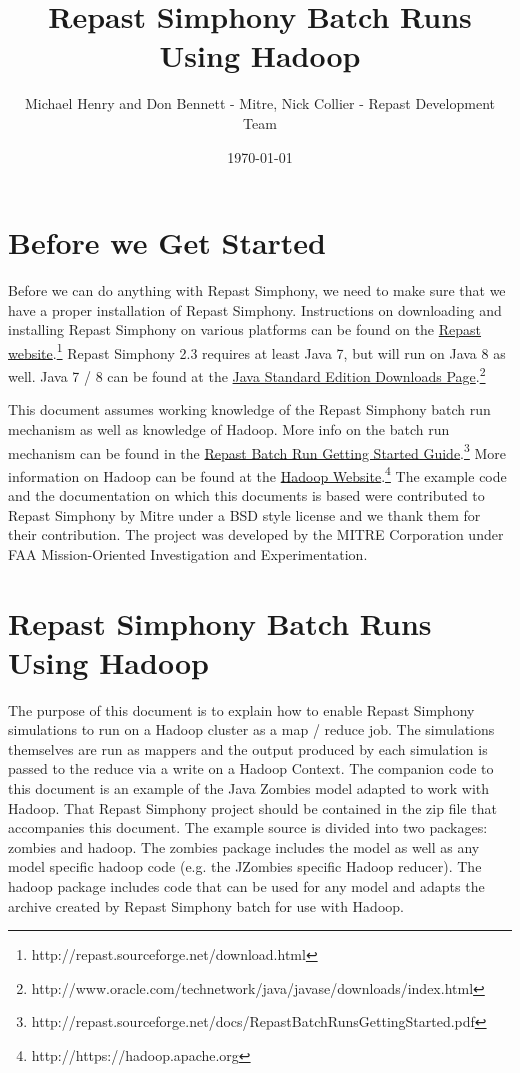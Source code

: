 \documentclass[11pt]{amsart}
\title{Repast Simphony Batch Runs Using Hadoop}
\author{Michael Henry and Don Bennett - Mitre, Nick Collier - Repast Development Team}
\date{\today}                                           %
\begin{document}
 
\maketitle
\setcounter{section}{-1}

\section{Before we Get Started}
Before we can do anything with Repast Simphony, we need to make sure that we have a proper installation of Repast Simphony. Instructions on downloading and installing Repast Simphony on various platforms can be found on the \href{http://repast.sourceforge.net/download.html}{Repast website}.\footnote{http://repast.sourceforge.net/download.html} Repast Simphony 2.3 requires at least Java 7, but will run on Java 8 as well. Java 7 / 8  can be found at the \href{http://www.oracle.com/technetwork/java/javase/downloads/index.html}{Java Standard Edition Downloads Page}.\footnote{http://www.oracle.com/technetwork/java/javase/downloads/index.html} 

This document assumes working knowledge of the Repast Simphony batch run mechanism as well as knowledge of Hadoop. More info on the batch run mechanism can be found in the \href{http://repast.sourceforge.net/docs/RepastBatchRunsGettingStarted.pdf}{Repast Batch Run Getting Started Guide}.\footnote{http://repast.sourceforge.net/docs/RepastBatchRunsGettingStarted.pdf} More information on Hadoop can be found at the \href{https://hadoop.apache.org}{Hadoop Website}.\footnote{http://https://hadoop.apache.org} The example code and the documentation on which this documents is based were contributed to Repast Simphony by Mitre under a BSD style license and we thank them for their contribution. The project was developed by the MITRE Corporation under FAA Mission-Oriented Investigation and Experimentation.

\section{Repast Simphony Batch Runs Using Hadoop}
The purpose of this document is to explain how to enable Repast Simphony simulations to run on a Hadoop cluster as a map / reduce job. The simulations themselves are run as mappers and the output produced by each simulation is passed to the reduce via a write on a Hadoop Context. The companion code to this document is an example of the Java Zombies model adapted to work with Hadoop. That Repast Simphony project should be contained in the zip file that accompanies this document. The example source is divided into two packages: zombies and hadoop. The zombies package includes the model as well as any model specific hadoop code (e.g. the JZombies specific Hadoop reducer). The hadoop package includes code that can be used for any model and adapts the archive created by Repast Simphony batch for use with Hadoop.
\end{document}

